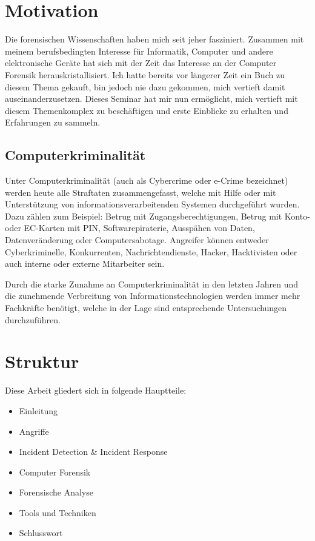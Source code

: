 \section{Motivation}
Die forensischen Wissenschaften haben mich seit jeher fasziniert. Zusammen mit meinem berufsbedingten Interesse für Informatik, Computer und andere elektronische Geräte hat sich mit der Zeit das Interesse an der Computer Forensik herauskristallisiert. Ich hatte bereits vor längerer Zeit ein Buch zu diesem Thema gekauft, bin jedoch nie dazu gekommen, mich vertieft damit auseinanderzusetzen. Dieses Seminar hat mir nun ermöglicht, mich vertieft mit diesem Themenkomplex zu beschäftigen und erste Einblicke zu erhalten und Erfahrungen zu sammeln.

\subsection{Computerkriminalität}
Unter Computerkriminalität (auch als Cybercrime oder e-Crime bezeichnet) werden heute alle Straftaten zusammengefasst, welche mit Hilfe oder mit Unterstützung von informationsverarbeitenden Systemen durchgeführt wurden. Dazu zählen zum Beispiel: Betrug mit Zugangsberechtigungen, Betrug mit Konto- oder EC-Karten mit PIN, Softwarepiraterie, Ausspähen von Daten, Datenveränderung oder Computersabotage. Angreifer können entweder Cyberkriminelle, Konkurrenten, Nachrichtendienste, Hacker, Hacktivisten oder auch interne oder externe Mitarbeiter sein.

Durch die starke Zunahme an Computerkriminalität in den letzten Jahren und die zunehmende Verbreitung von Informationstechnologien werden immer mehr Fachkräfte benötigt, welche in der Lage sind entsprechende Untersuchungen durchzuführen.

\section{Struktur}
Diese Arbeit gliedert sich in folgende Hauptteile:
\begin{itemize}
\item Einleitung
\item Angriffe
\item Incident Detection \& Incident Response
\item Computer Forensik
\item Forensische Analyse
\item Tools und Techniken
\item Schlusswort
\end{itemize}

